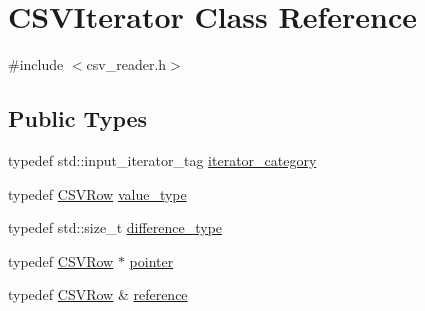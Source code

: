 \hypertarget{class_c_s_v_iterator}{}\section{C\+S\+V\+Iterator Class Reference}
\label{class_c_s_v_iterator}


{\ttfamily \#include $<$csv\+\_\+reader.\+h$>$}

\subsection*{Public Types}
\begin{DoxyCompactItemize}
\item 
typedef std\+::input\+\_\+iterator\+\_\+tag \hyperlink{class_c_s_v_iterator_a1e8e34ec6798b67292c1b1b9bf18e8f6}{iterator\+\_\+category}
\item 
typedef \hyperlink{class_c_s_v_row}{C\+S\+V\+Row} \hyperlink{class_c_s_v_iterator_a86931db4489064aa95164fee9123d40e}{value\+\_\+type}
\item 
typedef std\+::size\+\_\+t \hyperlink{class_c_s_v_iterator_a2decbf132c26754c9a32402b7bc9848f}{difference\+\_\+type}
\item 
typedef \hyperlink{class_c_s_v_row}{C\+S\+V\+Row} $\ast$ \hyperlink{class_c_s_v_iterator_a23ee3d00badf18d56739868b4f0c0240}{pointer}
\item 
typedef \hyperlink{class_c_s_v_row}{C\+S\+V\+Row} \& \hyperlink{class_c_s_v_iterator_a4f99b48a9e06dec230dda0b073d07d9e}{reference}
\end{DoxyCompactItemize}
